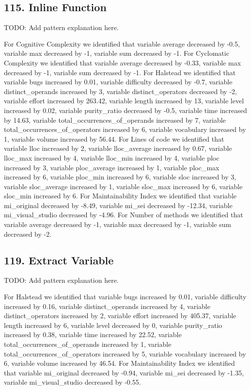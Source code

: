 \subsection{115. Inline Function}

TODO: Add pattern explanation here.

For Cognitive Complexity we identified that variable average decreased by -0.5, variable max decreased by -1, variable sum decreased by -1.
For Cyclomatic Complexity we identified that variable average decreased by -0.33, variable max decreased by -1, variable sum decreased by -1.
For Halstead we identified that variable bugs increased by 0.01, variable difficulty decreased by -0.7, variable distinct\_operands increased by 3, variable distinct\_operators decreased by -2, variable effort increased by 263.42, variable length increased by 13, variable level increased by 0.02, variable purity\_ratio decreased by -0.5, variable time increased by 14.63, variable total\_occurrences\_of\_operands increased by 7, variable total\_occurrences\_of\_operators increased by 6, variable vocabulary increased by 1, variable volume increased by 56.44.
For Lines of code we identified that variable lloc increased by 2, variable lloc\_average increased by 0.67, variable lloc\_max increased by 4, variable lloc\_min increased by 4, variable ploc increased by 3, variable ploc\_average increased by 1, variable ploc\_max increased by 6, variable ploc\_min increased by 6, variable sloc increased by 3, variable sloc\_average increased by 1, variable sloc\_max increased by 6, variable sloc\_min increased by 6.
For Maintainability Index we identified that variable mi\_original decreased by -8.49, variable mi\_sei decreased by -12.34, variable mi\_visual\_studio decreased by -4.96.
For Number of methods we identified that variable average decreased by -1, variable max decreased by -1, variable sum decreased by -2.

\subsection{119. Extract Variable}

TODO: Add pattern explanation here.

For Halstead we identified that variable bugs increased by 0.01, variable difficulty increased by 0.16, variable distinct\_operands increased by 4, variable distinct\_operators increased by 2, variable effort increased by 405.37, variable length increased by 6, variable level decreased by 0, variable purity\_ratio increased by 0.38, variable time increased by 22.52, variable total\_occurrences\_of\_operands increased by 1, variable total\_occurrences\_of\_operators increased by 5, variable vocabulary increased by 6, variable volume increased by 46.54.
For Maintainability Index we identified that variable mi\_original decreased by -0.94, variable mi\_sei decreased by -1.35, variable mi\_visual\_studio decreased by -0.55.

